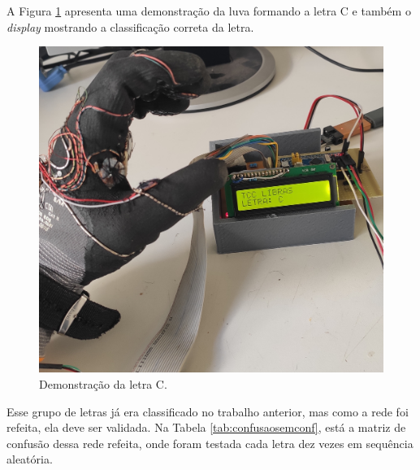 A Figura \ref{fig:letraC} apresenta uma demonstração da luva formando a letra C e também o \textit{display} mostrando a classificação correta da letra.

\begin{figure}[H]
	\centering
	\includegraphics[scale=0.15]{imagens/LetraCLuva.jpg}
	\caption{Demonstração da letra C.}
	\label{fig:letraC}
\end{figure}



 Esse grupo de letras já era classificado no trabalho anterior, mas como a rede foi refeita, ela deve ser validada. Na Tabela \ref{tab:confusaosemconf}, está a matriz de confusão dessa rede refeita, onde foram testada cada letra dez vezes em sequência aleatória.

